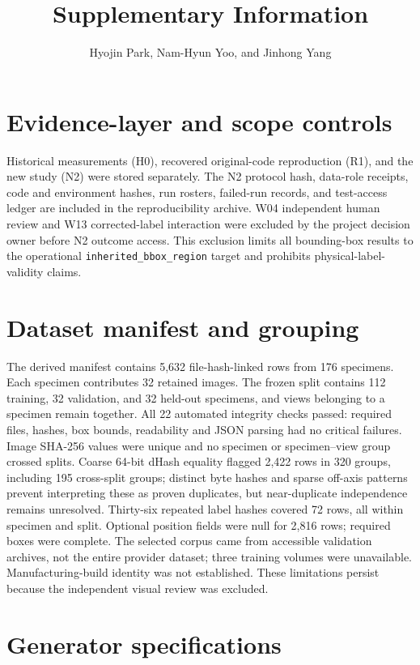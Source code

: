 \documentclass[11pt]{article}
\title{Supplementary Information\\\large \papertitle}
\author{Hyojin Park, Nam-Hyun Yoo, and Jinhong Yang}
\date{}
\begin{document}
\maketitle

\section{Evidence-layer and scope controls}
Historical measurements (H0), recovered original-code reproduction (R1), and the new study (N2) were stored separately. The N2 protocol hash, data-role receipts, code and environment hashes, run rosters, failed-run records, and test-access ledger are included in the reproducibility archive. W04 independent human review and W13 corrected-label interaction were excluded by the project decision owner before N2 outcome access. This exclusion limits all bounding-box results to the operational \texttt{inherited\_bbox\_region} target and prohibits physical-label-validity claims.

\section{Dataset manifest and grouping}
The derived manifest contains 5,632 file-hash-linked rows from 176 specimens. Each specimen contributes 32 retained images. The frozen split contains 112 training, 32 validation, and 32 held-out specimens, and views belonging to a specimen remain together. All 22 automated integrity checks passed: required files, hashes, box bounds, readability and JSON parsing had no critical failures. Image SHA-256 values were unique and no specimen or specimen--view group crossed splits. Coarse 64-bit dHash equality flagged 2,422 rows in 320 groups, including 195 cross-split groups; distinct byte hashes and sparse off-axis patterns prevent interpreting these as proven duplicates, but near-duplicate independence remains unresolved. Thirty-six repeated label hashes covered 72 rows, all within specimen and split. Optional position fields were null for 2,816 rows; required boxes were complete. The selected corpus came from accessible validation archives, not the entire provider dataset; three training volumes were unavailable. Manufacturing-build identity was not established. These limitations persist because the independent visual review was excluded.

\section{Generator specifications}


\end{document}
